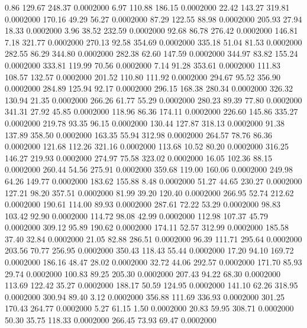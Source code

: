    0.86  129.67  248.37   0.0002000
   6.97  110.88  186.15   0.0002000
  22.42  143.27  319.81   0.0002000
 170.16   49.29   56.27   0.0002000
  87.29  122.55   88.98   0.0002000
 205.93   27.94   18.33   0.0002000
   3.96   38.52  232.59   0.0002000
  92.68   86.78  276.42   0.0002000
 146.81    7.18  321.77   0.0002000
 270.13   92.58  354.69   0.0002000
 335.18   51.04   81.53   0.0002000
 282.55   86.29  344.80   0.0002000
 282.38   62.60  147.59   0.0002000
 344.97   83.82  155.24   0.0002000
 333.81  119.99   70.56   0.0002000
   7.14   91.28  353.61   0.0002000
 111.83  108.57  132.57   0.0002000
 201.52  110.80  111.92   0.0002000
 294.67   95.52  356.90   0.0002000
 284.89  125.94   92.17   0.0002000
 296.15  168.38  280.34   0.0002000
 326.32  130.94   21.35   0.0002000
 266.26   61.77   55.29   0.0002000
 280.23   89.39   77.80   0.0002000
 341.31   27.92   45.85   0.0002000
 118.96   86.36  174.11   0.0002000
 226.60  145.86  335.27   0.0002000
 219.78   93.35   96.15   0.0002000
 130.44  127.87  318.13   0.0002000
  91.38  137.89  358.50   0.0002000
 163.35   55.94  312.98   0.0002000
 264.57   78.76   86.36   0.0002000
 121.68  112.26  321.16   0.0002000
 113.68   10.52   80.20   0.0002000
 316.25  146.27  219.93   0.0002000
 274.97   75.58  323.02   0.0002000
  16.05  102.36   88.15   0.0002000
 260.44   54.56  275.91   0.0002000
 359.68  119.00  160.06   0.0002000
 249.98   64.26  149.77   0.0002000
 183.62  155.88    8.48   0.0002000
  51.27   44.65  230.27   0.0002000
 127.21   98.20  357.51   0.0002000
  81.99   39.20  120.40   0.0002000
 266.95   52.74  212.62   0.0002000
 190.61  114.00   89.93   0.0002000
 287.61   72.22   53.29   0.0002000
  98.83  103.42   92.90   0.0002000
 114.72   98.08   42.99   0.0002000
 112.98  107.37   45.79   0.0002000
 309.12   95.89  190.62   0.0002000
 174.11   52.57  312.99   0.0002000
 185.58   37.40   32.84   0.0002000
  21.05   82.88  286.51   0.0002000
  96.39  111.71  295.64   0.0002000
 203.56   70.77  256.95   0.0002000
 350.43  118.43   55.44   0.0002000
  17.20   94.10  169.72   0.0002000
 186.16   48.47   28.02   0.0002000
  32.72   44.06  292.57   0.0002000
 171.70   85.93   29.74   0.0002000
 100.83   89.25  205.30   0.0002000
 207.43   94.22   68.30   0.0002000
 113.69  122.42   35.27   0.0002000
 188.17   50.59  124.95   0.0002000
 141.10   62.26  318.95   0.0002000
 300.94   89.40    3.12   0.0002000
 356.88  111.69  336.93   0.0002000
 301.25  170.43  264.77   0.0002000
   5.27   61.15    1.50   0.0002000
  20.83   59.95  308.71   0.0002000
  50.30   35.75  118.33   0.0002000
 266.45   73.93   69.47   0.0002000
